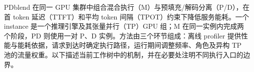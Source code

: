 \documentclass[11pt,a4paper,twocolumn]{article}
\begin{document}
\pagestyle{plain}
\raggedbottom
{}
PDblend 在同一 GPU 集群中组合混合执行（M）与预填充/解码分离（P/D），在首 token 延迟（TTFT）和平均 token 间隔（TPOT）约束下降低服务能耗。一个 instance 是一个推理引擎及其张量并行（TP）GPU 组；M 在同一实例内完成两个阶段，PD 则使用一对 P、D 实例。方法由三个环节组成：离线 profiler 提供性能与能耗依据，请求到达时确定执行路径，运行期间调整频率、角色及异构 TP 池的流量权重。以下描述当前工作树中的机制，并在必要处注明不同执行入口的边界。



\end{document}
